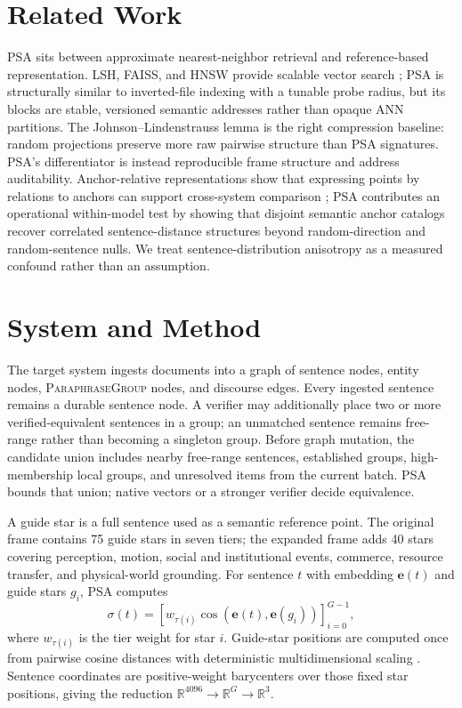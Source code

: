 \documentclass[11pt]{article}
\begin{document}
\section{Related Work}

PSA sits between approximate nearest-neighbor retrieval and reference-based representation. LSH, FAISS, and HNSW provide scalable vector search \citep{indyk1998approximate,johnson2019billion,malkov2020hnsw}; PSA is structurally similar to inverted-file indexing with a tunable probe radius, but its blocks are stable, versioned semantic addresses rather than opaque ANN partitions. The Johnson--Lindenstrauss lemma \citep{johnson1984extensions} is the right compression baseline: random projections preserve more raw pairwise structure than PSA signatures. PSA's differentiator is instead reproducible frame structure and address auditability. Anchor-relative representations show that expressing points by relations to anchors can support cross-system comparison \citep{moschella2023relative}; PSA contributes an operational within-model test by showing that disjoint semantic anchor catalogs recover correlated sentence-distance structures beyond random-direction and random-sentence nulls. We treat sentence-distribution anisotropy \citep{ethayarajh2019contextual} as a measured confound rather than an assumption.

\section{System and Method}
\label{sec:method}

The target system ingests documents into a graph of sentence nodes, entity nodes, \textsc{ParaphraseGroup} nodes, and discourse edges. Every ingested sentence remains a durable sentence node. A verifier may additionally place two or more verified-equivalent sentences in a group; an unmatched sentence remains free-range rather than becoming a singleton group. Before graph mutation, the candidate union includes nearby free-range sentences, established groups, high-membership local groups, and unresolved items from the current batch. PSA bounds that union; native vectors or a stronger verifier decide equivalence.

A guide star is a full sentence used as a semantic reference point. The original frame contains 75 guide stars in seven tiers; the expanded frame adds 40 stars covering perception, motion, social and institutional events, commerce, resource transfer, and physical-world grounding. For sentence $t$ with embedding $\mathbf{e}(t)$ and guide stars $g_i$, PSA computes
\begin{equation}
\sigma(t)=\left[w_{\tau(i)}\cos(\mathbf{e}(t),\mathbf{e}(g_i))\right]_{i=0}^{G-1},
\end{equation}
where $w_{\tau(i)}$ is the tier weight for star $i$. Guide-star positions are computed once from pairwise cosine distances with deterministic multidimensional scaling \citep{kruskal1964mds}. Sentence coordinates are positive-weight barycenters over those fixed star positions, giving the reduction $\mathbb{R}^{4096}\rightarrow\mathbb{R}^G\rightarrow\mathbb{R}^3$.
\end{document}
